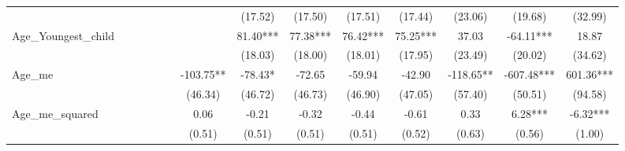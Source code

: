 \begin{subappendices}
{\begin{landscape}
\begin{table}[H]
{\begin{tabular}{lccccccccccccc}
                                         &                    &                         &                                  &             &                          &                   & (17.52)     & (17.50)              & (17.51)                 & (17.44)                  & (23.06)               & (19.68)                   & (32.99)                    \\
Age_Youngest_child                       &                    &                         &                                  &             &                          &                   & 81.40***    & 77.38***             & 76.42***                & 75.25***                 & 37.03                 & -64.11***                 & 18.87                      \\
                                         &                    &                         &                                  &             &                          &                   & (18.03)     & (18.00)              & (18.01)                 & (17.95)                  & (23.49)               & (20.02)                   & (34.62)                    \\
Age_me                                   &                    &                         &                                  &             &                          & -103.75**         & -78.43*     & -72.65               & -59.94                  & -42.90                   & -118.65**             & -607.48***                & 601.36***                  \\
                                         &                    &                         &                                  &             &                          & (46.34)           & (46.72)     & (46.73)              & (46.90)                 & (47.05)                  & (57.40)               & (50.51)                   & (94.58)                    \\
Age_me_squared                           &                    &                         &                                  &             &                          & 0.06              & -0.21       & -0.32                & -0.44                   & -0.61                    & 0.33                  & 6.28***                   & -6.32***                   \\
                                         &                    &                         &                                  &             &                          & (0.51)            & (0.51)      & (0.51)               & (0.51)                  & (0.52)                   & (0.63)                & (0.56)                    & (1.00)                     \\

\end{tabular}}
\end{table}
\end{landscape}}
\end{subappendices}
